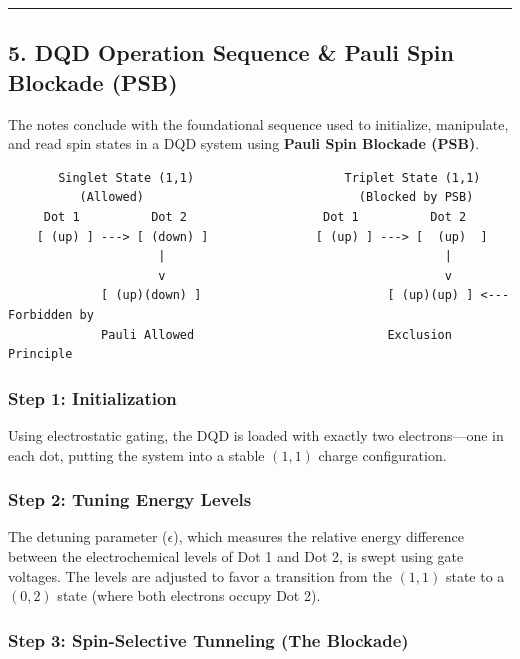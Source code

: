\documentclass[
]{article}
\begin{document}
\begin{center}\rule{0.5\linewidth}{0.5pt}\end{center}

\subsection{5. DQD Operation Sequence \& Pauli Spin Blockade
(PSB)}\label{dqd-operation-sequence-pauli-spin-blockade-psb}

The notes conclude with the foundational sequence used to initialize,
manipulate, and read spin states in a DQD system using \textbf{Pauli
Spin Blockade (PSB)}.

\begin{verbatim}
       Singlet State (1,1)                     Triplet State (1,1)
          (Allowed)                              (Blocked by PSB)
     Dot 1          Dot 2                   Dot 1          Dot 2
    [ (up) ] ---> [ (down) ]               [ (up) ] ---> [  (up)  ]
                     |                                       |
                     v                                       v
             [ (up)(down) ]                          [ (up)(up) ] <--- Forbidden by
             Pauli Allowed                           Exclusion Principle
\end{verbatim}

\subsubsection{Step 1: Initialization}\label{step-1-initialization}

Using electrostatic gating, the DQD is loaded with exactly two
electrons---one in each dot, putting the system into a stable \((1,1)\)
charge configuration.

\subsubsection{Step 2: Tuning Energy
Levels}\label{step-2-tuning-energy-levels}

The detuning parameter (\(\epsilon\)), which measures the relative
energy difference between the electrochemical levels of Dot 1 and Dot 2,
is swept using gate voltages. The levels are adjusted to favor a
transition from the \((1,1)\) state to a \((0,2)\) state (where both
electrons occupy Dot 2).

\subsubsection{Step 3: Spin-Selective Tunneling (The
Blockade)}\label{step-3-spin-selective-tunneling-the-blockade}
\end{document}
